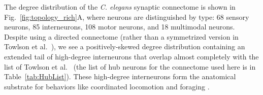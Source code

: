 \documentclass[10pt,letterpaper]{article}
\begin{document}

The degree distribution of the \emph{C. elegans} synaptic connectome is shown in Fig.~\ref{fig:topology_rich}A, where neurons are distinguished by type: 68 sensory neurons, 85 interneurons, 108 motor neurons, and 18 multimodal neurons.
Despite using a directed connectome (rather than a symmetrized version in Towlson et al.~\cite{Towlson:2013gf}), we see a positively-skewed degree distribution containing an extended tail of high-degree interneurons that overlap almost completely with the list of Towlson et al.~\cite{Towlson:2013gf} (the list of hub neurons for the connectome used here is in Table~\ref{tab:HubList}).
These high-degree interneurons form the anatomical substrate for behaviors like coordinated locomotion and foraging \cite{tsalik2003}.

\end{document}
